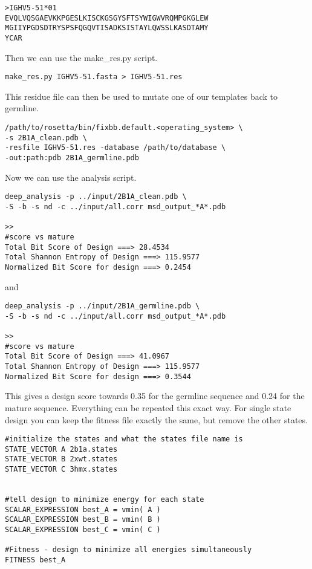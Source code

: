 \begin{verbatim}
>IGHV5-51*01
EVQLVQSGAEVKKPGESLKISCKGSGYSFTSYWIGWVRQMPGKGLEW
MGIIYPGDSDTRYSPSFQGQVTISADKSISTAYLQWSSLKASDTAMY
YCAR
\end{verbatim}

Then we can use the make\_res.py script.

\begin{lstlisting}[breaklines=true]
make_res.py IGHV5-51.fasta > IGHV5-51.res
\end{lstlisting}

This residue file can then be used to mutate one of our templates back to germline.
\begin{lstlisting}[breaklines=true]
/path/to/rosetta/bin/fixbb.default.<operating_system> \
-s 2B1A_clean.pdb \
-resfile IGHV5-51.res -database /path/to/database \
-out:path:pdb 2B1A_germline.pdb
\end{lstlisting}

Now we can use the analysis script.
\begin{lstlisting}[breaklines=true]
deep_analysis -p ../input/2B1A_clean.pdb \
-S -b -s nd -c ../input/all.corr msd_output_*A*.pdb

>>
#score vs mature
Total Bit Score of Design ===> 28.4534
Total Shannon Entropy of Design ===> 115.9577
Normalized Bit Score for design ===> 0.2454
\end{lstlisting}

and

\begin{lstlisting}[breaklines=true]
deep_analysis -p ../input/2B1A_germline.pdb \
-S -b -s nd -c ../input/all.corr msd_output_*A*.pdb

>>
#score vs mature
Total Bit Score of Design ===> 41.0967
Total Shannon Entropy of Design ===> 115.9577
Normalized Bit Score for design ===> 0.3544
\end{lstlisting}

This gives a design score towards 0.35 for the germline sequence and 0.24 for the mature sequence. Everything can be repeated this exact way. For single state design you can keep the fitness file exactly the same, but remove the other states.

\begin{lstlisting}[breaklines=true]
#initialize the states and what the states file name is
STATE_VECTOR A 2b1a.states
STATE_VECTOR B 2xwt.states
STATE_VECTOR C 3hmx.states


#tell design to minimize energy for each state
SCALAR_EXPRESSION best_A = vmin( A )
SCALAR_EXPRESSION best_B = vmin( B )
SCALAR_EXPRESSION best_C = vmin( C )

#Fitness - design to minimize all energies simultaneously
FITNESS best_A
\end{lstlisting}

